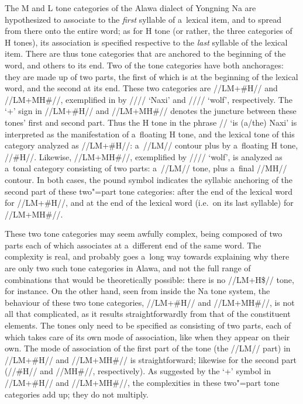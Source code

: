 {{{{{The M and L tone categories of the Alawa dialect of Yongning Na are hypothesized to associate to the \textit{first} syllable of a~lexical item, and to spread from there onto the entire word; as for H tone (or rather, the three categories of H tones), its association is specified respective to the \textit{last} syllable of the lexical item. There are thus tone categories that are anchored to the beginning of the word, and others to its end. Two of the tone categories have both anchorages: they are made up of two parts, the first of which is  at the beginning of the lexical word, and the second at its end. These two categories are //LM+\#H// and //LM+MH\#//, exemplified in  by //// ‘Naxi’ and //// ‘wolf’, respectively. The ‘+' sign in //LM+\#H// and //LM+MH\#// denotes the juncture between these tones' first and second part. Thus the H tone in the phrase // ‘is \mbox{(a/the)} Naxi’ is interpreted as the manifestation
of a~floating H tone, and the lexical tone of this category analyzed as //LM+\#H//: a~\mbox{//LM//}
contour plus by a~floating H tone, \mbox{//\#H//}. Likewise, //LM+MH\#//, exemplified by ////
‘wolf’, is analyzed as a~tonal category consisting of two parts: a~\mbox{//LM//} tone, plus a~final \mbox{//MH//}
{contour}. In both cases, the pound symbol indicates the syllabic {anchoring} of the second part of
these two"=part tone categories: after the end of the lexical word for //LM+\#H//, and at the end of
the lexical word (i.e.\ on its last syllable) for \mbox{//LM+MH\#//}. 

\newpage 
These two tone categories may seem awfully complex, being composed of two parts each of which associates at a~different end of the same word. The complexity is real, and probably goes a~long way towards explaining why there are only two such tone categories in Alawa, and not the full range of combinations that would be theoretically possible: there is no //LM+H\$// tone, for instance. On the other hand, seen from inside the Na tone system, the behaviour of these two tone categories, //LM+\#H// and //LM+MH\#//, is not all that complicated, as it results straightforwardly from that of the constituent elements. The tones only need to be specified as consisting of two parts, each of which takes care of its own mode of association, like when they appear on their own. The mode of association of the first part of the tone (the \mbox{//LM//} part) in //LM+\#H// and //LM+MH\#// is straightforward; likewise for the second part (\mbox{//\#H//} and \mbox{//MH\#//}, respectively). As suggested by the ‘+' symbol in //LM+\#H// and //LM+MH\#//, the complexities in these two"=part tone categories add up; they do not multiply.


}}}}}
